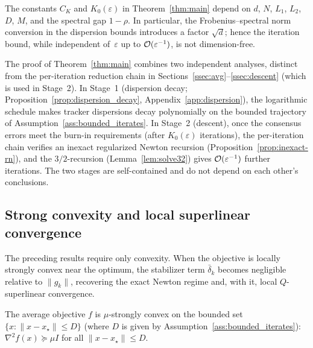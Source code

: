\documentclass[review,onefignum,onetabnum]{siamart171218}
\begin{document}
	\begin{remark}\label{rem:dim-constants}
		The constants $C_K$ and $K_0(\varepsilon)$ in
		Theorem~\ref{thm:main} depend on $d$, $N$, $L_1$, $L_2$, $D$,
		$M$, and the spectral gap $1-\rho$.  In particular, the
		Frobenius--spectral norm conversion in the dispersion bounds
		introduces a factor $\sqrt{d}$; hence the iteration bound, while
		independent of~$\varepsilon$ up to $\mathcal{O}(\varepsilon^{-1})$, is not
		dimension-free.
	\end{remark}

	\begin{remark}\label{rem:two_stages}
		The proof of Theorem~\ref{thm:main} combines two independent
		analyses, distinct from the per-iteration reduction chain in
		Sections~\ref{ssec:avg}--\ref{ssec:descent} (which is used in Stage~2).
		In Stage~1 (dispersion decay;
		Proposition~\ref{prop:dispersion_decay},
		Appendix~\ref{app:dispersion}), the logarithmic schedule
		makes tracker dispersions decay polynomially on the bounded
		trajectory of Assumption~\ref{ass:bounded_iterates}.
		In Stage~2 (descent), once the consensus errors meet the
		burn-in requirements
		(after $K_0(\varepsilon)$ iterations), the per-iteration chain
		verifies an inexact regularized Newton recursion
		(Proposition~\ref{prop:inexact-rn}), and the $3/2$-recursion
		(Lemma~\ref{lem:solve32}) gives $\mathcal{O}(\varepsilon^{-1})$ further
		iterations.
		The two stages are self-contained and do not depend on each other's conclusions.
	\end{remark}
	
	\subsection{Strong convexity and local superlinear convergence}\label{ssec:superlinear}
	The preceding results require only convexity.
	When the objective is locally strongly convex near the optimum,
	the stabilizer term $\bar\delta_k$ becomes negligible relative to
	$\|g_k\|$, recovering the exact Newton regime and, with it, local
	$Q$-superlinear convergence.
	
	\begin{assumption}\label{ass:strong}
		The average objective $f$ is $\mu$-strongly convex on the bounded set
		$\{x:\|x-x_\star\|\le D\}$ (where $D$ is given by
		Assumption~\ref{ass:bounded_iterates}):
		$\nabla^2 f(x)\succeq \mu I$ for all $\|x-x_\star\|\le D$.
	\end{assumption}
	
\end{document}
